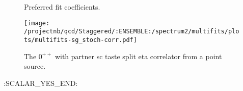 \begin{multicols}{2}
\begin{figure}[H]
\centering
\scriptsize

\caption{Preferred fit coefficients.}
\end{figure}
\columnbreak
\begin{figure}[H]
\centering
\texttt{[image: /projectnb/qcd/Staggered/:ENSEMBLE:/spectrum2/multifits/plots/multifits-sg\_stoch-corr.pdf]}
\caption{The $0^{++}$ with partner sc taste split eta correlator from a point source.}
\end{figure}
\end{multicols}

\clearpage
:SCALAR_YES_END:

